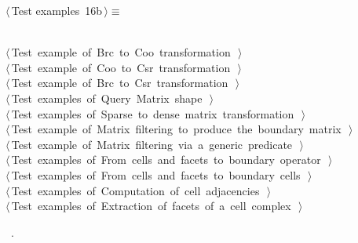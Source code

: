 \documentclass[11pt,oneside]{article}	%
\begin{document}
\begin{flushleft} \small
\begin{minipage}{\linewidth} \label{scrap31}
\protect{}$\langle\,$Test examples\nobreak\ {\footnotesize 16b}$\,\rangle\equiv$
\vspace{-1ex}
\begin{list}{}{} \item
\mbox{}\verb@@\\
\mbox{}\verb@@\hbox{$\langle\,$Test example of Brc to Coo transformation\nobreak\ {\footnotesize {}}$\,\rangle$}\verb@@\\
\mbox{}\verb@@\hbox{$\langle\,$Test example of Coo to Csr transformation\nobreak\ {\footnotesize {}}$\,\rangle$}\verb@@\\
\mbox{}\verb@@\hbox{$\langle\,$Test example of Brc to Csr transformation\nobreak\ {\footnotesize {}}$\,\rangle$}\verb@@\\
\mbox{}\verb@@\hbox{$\langle\,$Test examples of Query Matrix shape\nobreak\ {\footnotesize {}}$\,\rangle$}\verb@@\\
\mbox{}\verb@@\hbox{$\langle\,$Test examples of Sparse to dense matrix transformation\nobreak\ {\footnotesize {}}$\,\rangle$}\verb@@\\
\mbox{}\verb@@\hbox{$\langle\,$Test example of Matrix filtering to produce the boundary matrix\nobreak\ {\footnotesize {}}$\,\rangle$}\verb@@\\
\mbox{}\verb@@\hbox{$\langle\,$Test example of Matrix filtering via a generic predicate\nobreak\ {\footnotesize {}}$\,\rangle$}\verb@@\\
\mbox{}\verb@@\hbox{$\langle\,$Test examples of From cells and facets to boundary operator\nobreak\ {\footnotesize {}}$\,\rangle$}\verb@@\\
\mbox{}\verb@@\hbox{$\langle\,$Test examples of From cells and facets to boundary cells\nobreak\ {\footnotesize {}}$\,\rangle$}\verb@@\\
\mbox{}\verb@@\hbox{$\langle\,$Test examples of Computation of cell adjacencies\nobreak\ {\footnotesize {}}$\,\rangle$}\verb@@\\
\mbox{}\verb@@\hbox{$\langle\,$Test examples of Extraction of facets of a cell complex\nobreak\ {\footnotesize {}}$\,\rangle$}\verb@@\\
\mbox{}\verb@@{\NWsep}
\end{list}
\vspace{-1ex}
\footnotesize\addtolength{\baselineskip}{-1ex}
\begin{list}{}{\setlength{\itemsep}{-\parsep}\setlength{\itemindent}{-\leftmargin}}
\item \NWtxtMacroRefIn\ .
\end{list}
\end{minipage}\\[4ex]
\end{flushleft}
\end{document}
